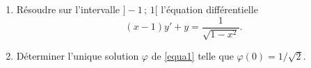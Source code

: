 \begin{exercice}\label{sujetjanvier2016ODE1}
  
\begin{enumerate}
\item Résoudre sur l'intervalle $]-1\,;\,1[$ l'équation différentielle 
    \begin{equation}\label{equa1}
      (x-1)y'+y=\dfrac{1}{\sqrt{1-x^2}}.
    \end{equation}
\item Déterminer l'unique solution $\varphi$ de \eqref{equa1} telle que $\varphi(0)=1/\sqrt{2}$.
\end{enumerate}
\end{exercice}
